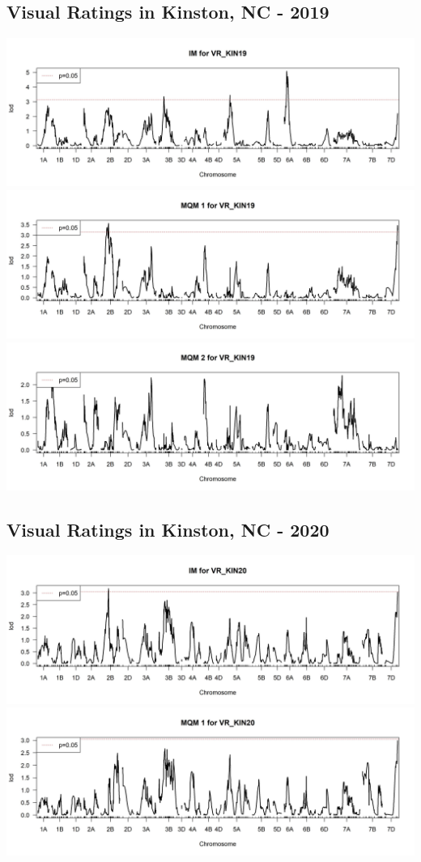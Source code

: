 \documentclass[
]{article}
\begin{document}
\subsection{Visual Ratings in Kinston, NC -
2019}\label{visual-ratings-in-kinston-nc---2019}

\includegraphics{Scan_IM_VR_KIN19.jpg}
\includegraphics{Scan_MQM1_VR_KIN19.jpg}
\includegraphics{Scan_MQM2_VR_KIN19.jpg} \pagebreak

\subsection{Visual Ratings in Kinston, NC -
2020}\label{visual-ratings-in-kinston-nc---2020}

\includegraphics{Scan_IM_VR_KIN20.jpg}
\includegraphics{Scan_MQM1_VR_KIN20.jpg} \pagebreak
\end{document}
